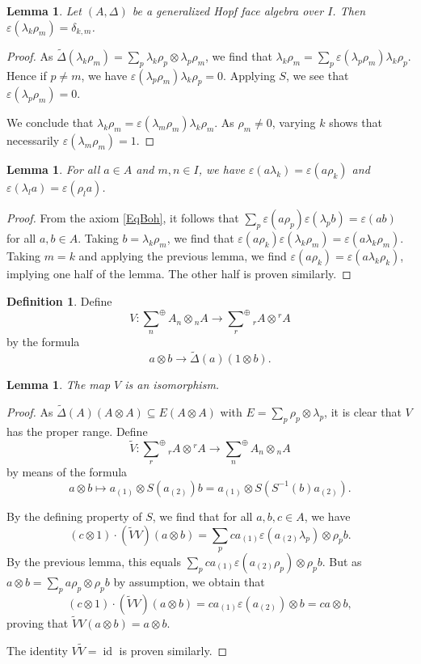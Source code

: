 \documentclass[12pt]{article}
\theoremstyle{change}
\DeclareMathOperator{\id}{id}
\newcommand{\osum}[1]{\underset{#1}{\sum}^{\oplus}}
\newcommand{\wDelta}{\widetilde{\Delta}}
\newtheorem{Lem}[Theorem]{Lemma}
\theoremstyle{definition}
\newtheorem{Def}[Theorem]{Definition}
\numberwithin{equation}{section}
\begin{document}

\begin{Lem} Let $(A,\Delta)$ be a generalized Hopf face algebra over $I$. Then $\varepsilon(\lambda_k\rho_m)=\delta_{k,m}$.
\end{Lem}
\begin{proof} As $\wDelta(\lambda_k\rho_m) = \sum_p \lambda_k\rho_p\otimes \lambda_p\rho_m$, we find that $\lambda_k\rho_m = \sum_p  \varepsilon(\lambda_p\rho_m)\lambda_k\rho_p$. Hence if $p\neq m$, we have $\varepsilon(\lambda_p\rho_m)\lambda_k\rho_p=0$. Applying $S$, we see that $\varepsilon(\lambda_p\rho_m)=0$.

We conclude that $\lambda_k\rho_m = \varepsilon(\lambda_m\rho_m)\lambda_k\rho_m$. As $\rho_m \neq 0$, varying $k$ shows that necessarily $\varepsilon(\lambda_m\rho_m)=1$.
\end{proof}


\begin{Lem} For all $a\in A$ and $m,n\in I$, we have $\varepsilon(a\lambda_k) = \varepsilon(a\rho_k)$ and $\varepsilon(\lambda_la)=\varepsilon(\rho_la)$.
\end{Lem}
\begin{proof} From the axiom \ref{EqBoh}, it follows that $\sum_p \varepsilon(a\rho_p)\varepsilon(\lambda_pb)= \varepsilon(ab)$ for all $a,b\in A$. Taking $b = \lambda_k\rho_m$, we find that $\varepsilon(a\rho_k)\varepsilon(\lambda_k\rho_m) = \varepsilon(a\lambda_k\rho_m)$. Taking $m=k$ and applying the previous lemma, we find $\varepsilon(a\rho_k)=\varepsilon(a\lambda_k\rho_k)$, implying one half of the lemma. The other half is proven similarly.
\end{proof}

\begin{Def} Define \[V: \osum{n} A_n\otimes {}_{n}A \rightarrow \osum{r} {}_rA\otimes {}^rA\] by the formula \[a\otimes b\rightarrow \wDelta(a)(1\otimes b).\]
\end{Def}

\begin{Lem}\label{LemUni} The map $V$ is an isomorphism.
\end{Lem}
\begin{proof} As $\wDelta(A)(A\otimes A)\subseteq E(A\otimes A)$ with $E = \sum_p \rho_p\otimes \lambda_p$, it is clear that $V$ has the proper range. Define \[\widetilde{V}:  \osum{r} {}_rA\otimes {}^rA\rightarrow\osum{n} A_n\otimes {}_{n}A\] by means of the formula \[a\otimes b \mapsto a_{(1)}\otimes S(a_{(2)})b = a_{(1)}\otimes S(S^{-1}(b)a_{(2)}).\]

By the defining property of $S$, we find that for all $a,b,c\in A$, we have \[(c\otimes 1)\cdot (\widetilde{V}V)(a\otimes b) = \sum_p ca_{(1)}\varepsilon(a_{(2)}\lambda_p)\otimes \rho_pb.\] By the previous lemma, this equals $\sum_p ca_{(1)}\varepsilon(a_{(2)}\rho_p)\otimes \rho_pb$. But as $a\otimes b = \sum_p a\rho_p\otimes \rho_pb$ by assumption, we obtain that \[(c\otimes 1)\cdot (\widetilde{V}V)(a\otimes b) = ca_{(1)}\varepsilon(a_{(2)})\otimes b = ca\otimes b,\] proving that $\widetilde{V}V(a\otimes b) = a\otimes b$.

The identity $V\widetilde{V} = \id$ is proven similarly.
\end{proof}
\end{document}
